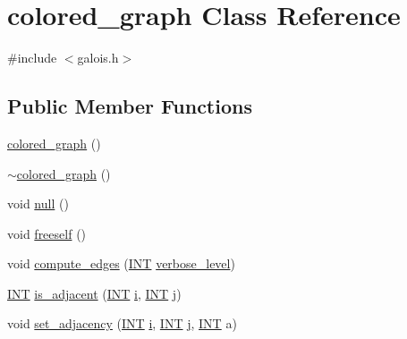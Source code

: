 \hypertarget{classcolored__graph}{}\section{colored\+\_\+graph Class Reference}
\label{classcolored__graph}


{\ttfamily \#include $<$galois.\+h$>$}

\subsection*{Public Member Functions}
\begin{DoxyCompactItemize}
\item 
\mbox{\hyperlink{classcolored__graph_a104bcd930e68c04e4786678923bfdca1}{colored\+\_\+graph}} ()
\item 
\mbox{\hyperlink{classcolored__graph_a93ffac97a5f321e670478f0a44cc8b55}{$\sim$colored\+\_\+graph}} ()
\item 
void \mbox{\hyperlink{classcolored__graph_ac73b077b50e6439a617aec3f1f3fd864}{null}} ()
\item 
void \mbox{\hyperlink{classcolored__graph_a535b58df68ad6200bd6c8cde9bd09f57}{freeself}} ()
\item 
void \mbox{\hyperlink{classcolored__graph_a96fc94940e35bc6e6951bc355b48e5be}{compute\+\_\+edges}} (\mbox{\hyperlink{galois_8h_a09fddde158a3a20bd2dcadb609de11dc}{I\+NT}} \mbox{\hyperlink{simeon_8_c_a818073fbcc2f439e7c56952f67386122}{verbose\+\_\+level}})
\item 
\mbox{\hyperlink{galois_8h_a09fddde158a3a20bd2dcadb609de11dc}{I\+NT}} \mbox{\hyperlink{classcolored__graph_ac13cc7a798c3ee11bef01f01c8eab061}{is\+\_\+adjacent}} (\mbox{\hyperlink{galois_8h_a09fddde158a3a20bd2dcadb609de11dc}{I\+NT}} \mbox{\hyperlink{alphabet2_8_c_acb559820d9ca11295b4500f179ef6392}{i}}, \mbox{\hyperlink{galois_8h_a09fddde158a3a20bd2dcadb609de11dc}{I\+NT}} \mbox{\hyperlink{alphabet2_8_c_a37d972ae0b47b9099e30983131d31916}{j}})
\item 
void \mbox{\hyperlink{classcolored__graph_a3c850d5d5d6bde5de472a07ff7c49687}{set\+\_\+adjacency}} (\mbox{\hyperlink{galois_8h_a09fddde158a3a20bd2dcadb609de11dc}{I\+NT}} \mbox{\hyperlink{alphabet2_8_c_acb559820d9ca11295b4500f179ef6392}{i}}, \mbox{\hyperlink{galois_8h_a09fddde158a3a20bd2dcadb609de11dc}{I\+NT}} \mbox{\hyperlink{alphabet2_8_c_a37d972ae0b47b9099e30983131d31916}{j}}, \mbox{\hyperlink{galois_8h_a09fddde158a3a20bd2dcadb609de11dc}{I\+NT}} a)
\item 

\end{DoxyCompactItemize}
